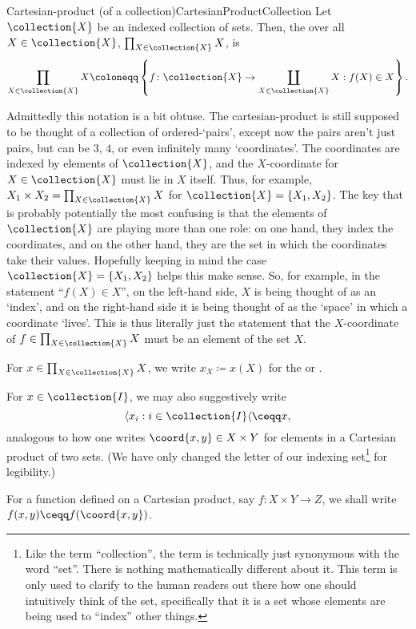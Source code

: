 \begin{dfn}{Cartesian-product (of a collection)}{CartesianProductCollection}
Let $\collection{X}$ be an indexed collection of sets.  Then, the  over all $X\in \collection{X}$, $\prod _{X\in \collection{X}}X$, is
\begin{equation}
\prod _{X\in \collection{X}}X\coloneqq \left\{ f\colon \collection{X}\rightarrow \coprod _{X\in \collection{X}}X:f(X)\in X\right\} .
\end{equation}
\begin{rmk}
Admittedly this notation is a bit obtuse.  The cartesian-product is still supposed to be thought of a collection of ordered-`pairs', except now the pairs aren't just pairs, but can be $3$, $4$, or even infinitely many `coordinates'.  The coordinates are indexed by elements of $\collection{X}$, and the $X$-coordinate for $X\in \collection{X}$ must lie in $X$ itself.  Thus, for example, $X_1\times X_2=\prod _{X\in \collection{X}}X$ for $\collection{X}=\{ X_1,X_2\}$.  The key that is probably potentially the most confusing is that the elements of $\collection{X}$ are playing more than one role:  on one hand, they index the coordinates, and on the other hand, they are the set in which the coordinates take their values.  Hopefully keeping in mind the case $\collection{X}=\{ X_1,X_2\}$ helps this make sense.  So, for example, in the statement ``$f(X)\in X$'', on the left-hand side, $X$ is being thought of as an `index', and on the right-hand side it is being thought of as the `space' in which a coordinate `lives'.  This is thus literally just the statement that the $X$-coordinate of $f\in \prod _{X\in \collection{X}}X$ must be an element of the set $X$.
\end{rmk}
\begin{rmk}
For $x\in \prod _{X\in \collection{X}}X$, we write $x_X\coloneqq x(X)$ for the  or .
\end{rmk}
\begin{rmk}
For $x\in \collection{I}$, we may also suggestively write
\begin{equation}
\langle x_i:i\in \collection{I}\langle \ceqq x,
\end{equation}
analogous to how one writes $\coord{x,y}\in X\times Y$ for elements in a Cartesian product of two sets.  (We have only changed the letter of our indexing set\footnote{Like the term ``collection'', the term  is technically just synonymous with the word ``set''.  There is nothing mathematically different about it.  This term is only used to clarify to the human readers out there how one should intuitively think of the set, specifically that it is a set whose elements are being used to ``index'' other things.} for legibility.)	
\end{rmk}
\begin{rmk}
For a function defined on a Cartesian product, say $f\colon X\times Y\rightarrow Z$, we shall write $f(x,y)\ceqq f(\coord{x,y})$.
\end{rmk}
\end{dfn}
